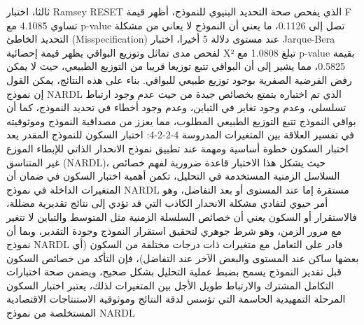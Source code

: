 \documentclass[12pt,a4paper]{report}
\begin{document}
ثالثا، اختبار Ramsey RESET الذي يفحص صحة التحديد البنيوي للنموذج، أظهر قيمة F تساوي 4.1085 مع p-value تصل إلى 0.1126، ما يعني أن النموذج لا يعاني من مشكلة التحديد الخاطئ (Misspecification) عند مستوى دلالة 5%
أخيرا، اختبار Jarque-Bera لفحص مدى تماثل وتوزيع البواقي يظهر قيمة إحصائية X² تبلغ 1.0808 مع p-value بقيمة 0.5825، مما يشير إلى أن البواقي تتبع توزيعا قريبا من التوزيع الطبيعي، حيث لا يمكن رفض الفرضية الصفرية بوجود توزيع طبيعي للبواقي.
بناء على هذه النتائج، يمكن القول إن نموذج NARDL الذي تم اختباره يتمتع بخصائص جيدة من حيث عدم وجود ارتباط تسلسلي، وعدم وجود تغاير في التباين، وعدم وجود أخطاء في تحديد النموذج، كما أن بواقي النموذج تتبع التوزيع الطبيعي المطلوب، مما يعزز من مصداقية النموذج وموثوقيته في تفسير العلاقة بين المتغيرات المدروسة
4-2-2-4: اختبار السكون للنموذج المقدر
يعد اختبار السكون خطوة أساسية ومهمة عند تطبيق نموذج الانحدار الذاتي للإبطاء الموزع غير المتناسق (NARDL)، حيث يشكل هذا الاختبار قاعدة ضرورية لفهم خصائص السلاسل الزمنية المستخدمة في التحليل، تكمن أهمية اختبار السكون في ضمان أن المتغيرات الداخلة في نموذج NARDL مستقرة إما عند المستوى أو بعد التفاضل، وهو أمر حيوي لتفادي مشكلة الانحدار الكاذب التي قد تؤدي إلى نتائج تقديرية مضللة، فالاستقرار أو السكون يعني أن خصائص السلسلة الزمنية مثل المتوسط والتباين لا تتغير مع مرور الزمن، وهو شرط جوهري لتحقيق استقرار النموذج وجودة التقدير، وبما أن نموذج NARDL قادر على التعامل مع متغيرات ذات درجات مختلفة من السكون (أي بعضها ساكن عند المستوى والبعض الآخر عند التفاضل)، فإن التأكد من خصائص السكون قبل تقدير النموذج يسمح بضبط عملية التحليل بشكل صحيح، ويضمن صحة اختبارات التكامل المشترك والارتباط طويل الأجل بين المتغيرات لذلك، يعتبر اختبار السكون المرحلة التمهيدية الحاسمة التي تؤسس لدقة النتائج وموثوقية الاستنتاجات الاقتصادية المستخلصة من نموذج NARDL
\end{document}
